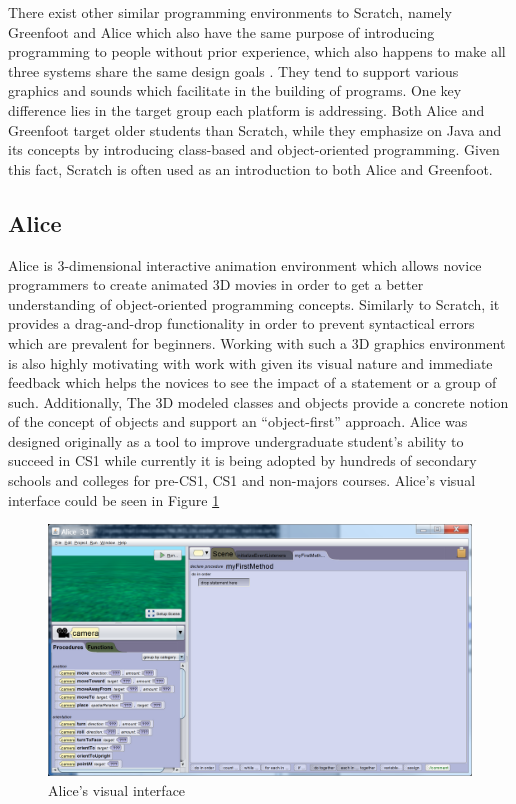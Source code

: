 There exist other similar programming environments to Scratch, namely Greenfoot and Alice which also have the same purpose of introducing programming to people without prior experience, which also happens to make all three systems share the same design goals \cite{AliceGreenfootScratch}. They tend to support various graphics and sounds which facilitate in the building of programs. One key difference lies in the target group each platform is addressing. Both Alice and Greenfoot target older students than Scratch, while they emphasize on Java and its concepts by introducing class-based and object-oriented programming. Given this fact, Scratch is often used as an introduction to both Alice and Greenfoot.
\subsection{Alice}
Alice is 3-dimensional interactive animation environment which allows novice programmers to create animated 3D movies in order to get a better understanding of object-oriented programming concepts. Similarly to Scratch, it provides a drag-and-drop functionality in order to prevent syntactical errors which are prevalent for beginners. Working with such a 3D graphics environment is also highly motivating with work with given its visual nature and immediate feedback which helps the novices to see the impact of a statement or a group of such.
Additionally,  The 3D modeled classes and objects
provide a concrete notion of the concept of objects
and support an “object-first” approach. Alice was designed originally as a tool to improve undergraduate student's ability to succeed in CS1 while currently it is being adopted by hundreds of secondary schools and colleges for pre-CS1, CS1 and non-majors courses.\cite{Alicecourse} Alice's visual interface could be seen in Figure \ref{fig:alice_environment}
\begin{figure}[H]
\begin{center}
\includegraphics[scale=0.14]{./pics/Alice3D.png}
\caption{Alice's visual interface}
\label{fig:alice_environment}
\end{center}
\end{figure}
